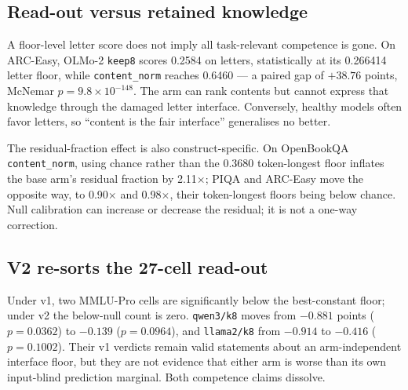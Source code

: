\subsection{Read-out versus retained knowledge}

A floor-level letter score does not imply all task-relevant competence is gone. On ARC-Easy, OLMo-2 \texttt{keep8} scores 0.2584 on letters, statistically at its 0.266414 letter floor, while \texttt{content\_norm} reaches 0.6460 --- a paired gap of $+38.76$ points, McNemar $p=9.8\times10^{-148}$. The arm can rank contents but cannot express that knowledge through the damaged letter interface. Conversely, healthy models often favor letters, so ``content is the fair interface'' generalises no better.

The residual-fraction effect is also construct-specific. On OpenBookQA \texttt{content\_norm}, using chance rather than the 0.3680 token-longest floor inflates the base arm's residual fraction by 2.11$\times$; PIQA and ARC-Easy move the opposite way, to 0.90$\times$ and 0.98$\times$, their token-longest floors being below chance. Null calibration can increase or decrease the residual; it is not a one-way correction.

\subsection{V2 re-sorts the 27-cell read-out}

Under v1, two MMLU-Pro cells are significantly below the best-constant floor; under v2 the below-null count is zero. \texttt{qwen3/k8} moves from $-0.881$ points ($p=0.0362$) to $-0.139$ ($p=0.0964$), and \texttt{llama2/k8} from $-0.914$ to $-0.416$ ($p=0.1002$). Their v1 verdicts remain valid statements about an arm-independent interface floor, but they are not evidence that either arm is worse than its own input-blind prediction marginal. Both competence claims dissolve.

